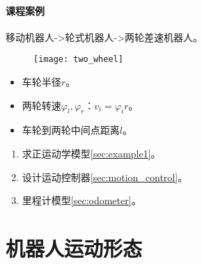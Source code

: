 \documentclass[
12pt, %
a4paper, 
oneside, %
headinclude,footinclude, %
]{scrartcl}
\begin{document}
\paragraph{课程案例}\label{sec:two_wheel}
移动机器人->轮式机器人->两轮差速机器人。

\begin{minipage}{0.45\textwidth}
\begin{figure}[H]
\centering
\texttt{[image: two\_wheel]} 
\end{figure}
\end{minipage}
\hfill
\begin{minipage}{0.45\textwidth}
\begin{itemize}
\item 车轮半径$ r $。
\item 两轮转速$ \varphi_l,\varphi_r $：$ v_i = \varphi_i r $。
\item 车轮到两轮中间点距离$ l $。
\end{itemize}
\end{minipage}

\begin{enumerate}
\item 求正运动学模型\ref{sec:example1}。
\item 设计运动控制器\ref{sec:motion_control}。
\item 里程计模型\ref{sec:odometer}。
\end{enumerate}
\section{机器人运动形态}
\end{document}
